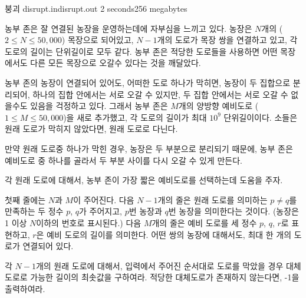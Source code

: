 \begin{problem}{붕괴}
	{disrupt.in}{disrupt.out}
	{2 seconds}{256 megabytes}{}
	
	농부 존은 잘 연결된 농장을 운영하는데에 자부심을 느끼고 있다. 농장은 $N$개의 ($2 \le N \le 50,000$) 목장으로 되어있고, $N-1$개의 도로가 목장 쌍을 연결하고 있고, 각 도로의 길이는 단위길이로 모두 같다. 농부 존은 적당한 도로들을 사용하면 어떤 목장에서도 다른 모든 목장으로 오갈수 있다는 것을 깨달았다.
	
	농부 존의 농장이 연결되어 있어도, 어떠한 도로 하나가 막히면, 농장이 두 집합으로 분리되어, 하나의 집합 안에서는 서로 오갈 수 있지만, 두 집합 안에서는 서로 오갈 수 없을수도 있음을 걱정하고 있다. 그래서 농부 존은 $M$개의 양방향 예비도로 ($1 \le M \le 50,000$)을 새로 추가했고, 각 도로의 길이가 최대 $10^9$ 단위길이이다. 소들은 원래 도로가 막히지 않았다면, 원래 도로로 다닌다.
	
	만약 원래 도로중 하나가 막힌 경우, 농장은 두 부분으로 분리되기 때문에, 농부 존은 예비도로 중 하나를 골라서 두 부분 사이를 다시 오갈 수 있게 만든다.
	
	각 원래 도로에 대해서, 농부 존이 가장 짧은 예비도로를 선택하는데 도움을 주자.
	
	
	\InputFile
	
	첫째 줄에는 $N$과 $M$이 주어진다. 다음 $N-1$개의 줄은 원래 도로를 의미하는 $p \ne q$를 만족하는 두 정수 $p$, $q$가 주어지고, $p$번 농장과 $q$번 농장을 의미한다는 것이다. (농장은 1 이상 $N$이하의 번호로 표시된다.) 다음 $M$개의 줄은 예비 도로를 세 정수 $p$, $q$, $r$로 표현하고, $r$은 예비 도로의 길이를 의미한다. 어떤 쌍의 농장에 대해서도, 최대 한 개의 도로가 연결되어 있다.
	
	\OutputFile
	
	각 $N-1$개의 원래 도로에 대해서, 입력에서 주어진 순서대로 도로를 막았을 경우 대체도로로 가능한 길이의 최솟값을 구하여라. 적당한 대체도로가 존재하지 않는다면, -1을 출력하여라.
	
	\Examples
		
	\begin{example}
	\end{example}

	
\end{problem}

